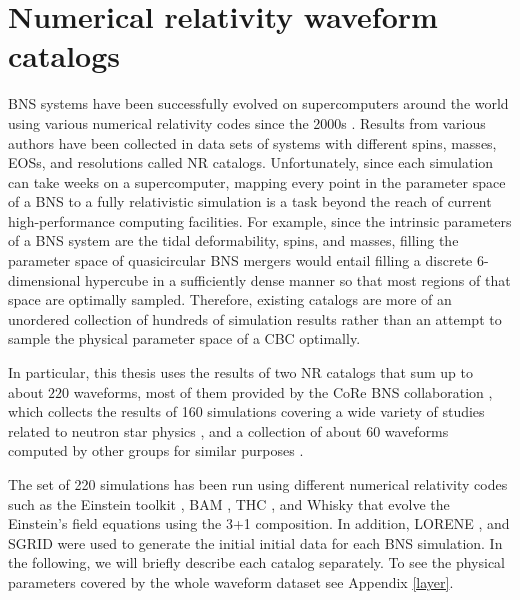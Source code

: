 \newpage
\section{Numerical relativity waveform catalogs}\label{NR}

BNS systems have been successfully evolved on supercomputers around the world using various numerical relativity codes since the 2000s \cite{Shibata:1999hn,Shibata:1999wm,Shibata:2019wef}. Results from various authors have been collected in data sets of systems with different spins, masses, EOSs, and resolutions called NR catalogs. Unfortunately, since each simulation can take weeks on a supercomputer, mapping every point in the parameter space of a BNS to a fully relativistic simulation is a task beyond the reach of current high-performance computing facilities. For example, since the intrinsic parameters of a BNS system are the tidal deformability, spins, and masses, filling the parameter space of quasicircular BNS mergers would entail filling a discrete 6-dimensional hypercube in a sufficiently dense manner so that most regions of that space are optimally sampled. Therefore, existing catalogs are more of an unordered collection of hundreds of simulation results rather than an attempt to sample the physical parameter space of a CBC optimally. 


In particular, this thesis uses the results of two NR catalogs that sum up to about $220$ waveforms, most of them provided by the CoRe BNS collaboration \cite{Dietrich:2018phi}, which collects the results of 160 simulations covering a wide variety of studies related to neutron star physics \cite{Bernuzzi:2014kca,Dietrich:2016hky,Bernuzzi:2016pie,Dietrich:2017aum, Dietrich:2016lyp,Dietrich:2015pxa,Dietrich:2017xqb,Radice:2017zta,Bernuzzi:2014owa,Dietrich:2015iva,Bernuzzi:2015rla, Radice:2016gym,Radice:2016rys,Radice:2017lry,Dietrich:2017feu, Zappa:2017xba}, and a collection of about 60 waveforms computed by other groups for similar purposes \cite{Maione:2016zqz, Kastaun:2016elu,Maione:2017aux,Ciolfi:2017uak,Feo:2016cbs, Kawamura:2016nmk,DePietri:2015lya,DePietri:2018tpx}.

The set of 220 simulations has been run using different numerical relativity codes such as the Einstein toolkit \cite{Loffler:2011ay,Mosta:2013gwu}, BAM \cite{PhysRevLett.92.211101,PhysRevD.77.024027,Thierfelder:2011yi}, THC \cite{Radice_2012}, and Whisky \cite{Baiotti:2003btu,Giacomazzo:2007ti} that evolve the Einstein's field equations using the 3+1 composition. In addition, LORENE \cite{lorene}, and SGRID \cite{Tichy_2009,Tichy_2012,Dietrich_2015} were used to generate the initial initial data for each BNS simulation. In the following, we will briefly describe each catalog separately. To see the physical parameters covered by the whole waveform dataset see Appendix \ref{layer}.



